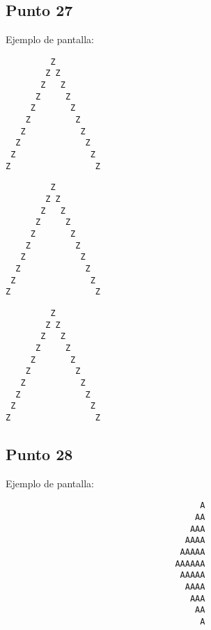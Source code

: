 



\subsection{Punto 27}
	
	Ejemplo de pantalla:
\begin{lstlisting}
         Z
        Z Z
       Z   Z
      Z     Z
     Z       Z
    Z         Z
   Z           Z
  Z             Z
 Z               Z
Z                 Z
\end{lstlisting}

\begin{lstlisting}
         Z
        Z Z
       Z   Z
      Z     Z
     Z       Z
    Z         Z
   Z           Z
  Z             Z
 Z               Z
Z                 Z
\end{lstlisting}

\begin{lstlisting}
         Z
        Z Z
       Z   Z
      Z     Z
     Z       Z
    Z         Z
   Z           Z
  Z             Z
 Z               Z
Z                 Z
\end{lstlisting}







\subsection{Punto 28}
	
	Ejemplo de pantalla:
\begin{lstlisting}
                                       A
                                      AA
                                     AAA
                                    AAAA
                                   AAAAA
                                  AAAAAA
                                   AAAAA
                                    AAAA
                                     AAA
                                      AA
                                       A
\end{lstlisting}

